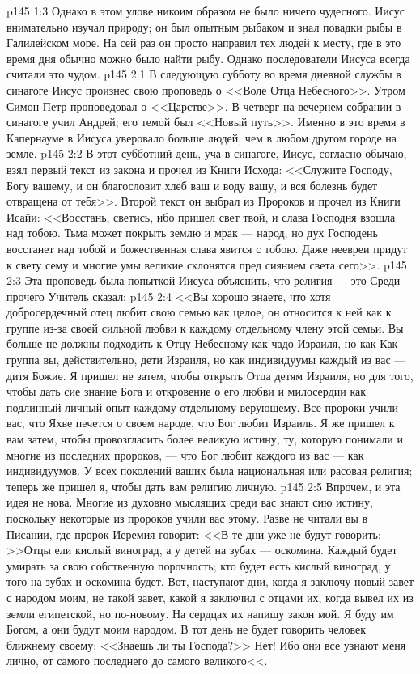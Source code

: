 \vs p145 1:3 Однако в этом улове никоим образом не было ничего чудесного. Иисус внимательно изучал природу; он был опытным рыбаком и знал повадки рыбы в Галилейском море. На сей раз он просто направил тех людей к месту, где в это время дня обычно можно было найти рыбу. Однако последователи Иисуса всегда считали это чудом.
\vs p145 2:1 В следующую субботу во время дневной службы в синагоге Иисус произнес свою проповедь о <<Воле Отца Небесного>>. Утром Симон Петр проповедовал о <<Царстве>>. В четверг на вечернем собрании в синагоге учил Андрей; его темой был <<Новый путь>>. Именно в это время в Капернауме в Иисуса уверовало больше людей, чем в любом другом городе на земле.
\vs p145 2:2 В этот субботний день, уча в синагоге, Иисус, согласно обычаю, взял первый текст из закона и прочел из Книги Исхода: <<Служите Господу, Богу вашему, и он благословит хлеб ваш и воду вашу, и вся болезнь будет отвращена от тебя>>. Второй текст он выбрал из Пророков и прочел из Книги Исайи: <<Восстань, светись, ибо пришел свет твой, и слава Господня взошла над тобою. Тьма может покрыть землю и мрак --- народ, но дух Господень восстанет над тобой и божественная слава явится с тобою. Даже неевреи придут к свету сему и многие умы великие склонятся пред сиянием света сего>>.
\vs p145 2:3 Эта проповедь была попыткой Иисуса объяснить, что религия --- это  Среди прочего Учитель сказал:
\vs p145 2:4 <<Вы хорошо знаете, что хотя добросердечный отец любит свою семью как целое, он относится к ней как к группе из\hyp{}за своей сильной любви к каждому отдельному члену этой семьи. Вы больше не должны подходить к Отцу Небесному как чадо Израиля, но как  Как группа вы, действительно, дети Израиля, но как индивидуумы каждый из вас --- дитя Божие. Я пришел не затем, чтобы открыть Отца детям Израиля, но для того, чтобы дать сие знание Бога и откровение о его любви и милосердии как подлинный личный опыт каждому отдельному верующему. Все пророки учили вас, что Яхве печется о своем народе, что Бог любит Израиль. Я же пришел к вам затем, чтобы провозгласить более великую истину, ту, которую понимали и многие из последних пророков, --- что Бог любит  каждого из вас --- как индивидуумов. У всех поколений ваших была национальная или расовая религия; теперь же пришел я, чтобы дать вам религию личную.
\vs p145 2:5 Впрочем, и эта идея не нова. Многие из духовно мыслящих среди вас знают сию истину, поскольку некоторые из пророков учили вас этому. Разве не читали вы в Писании, где пророк Иеремия говорит: <<В те дни уже не будут говорить: >>Отцы ели кислый виноград, а у детей на зубах --- оскомина. Каждый будет умирать за свою собственную порочность; кто будет есть кислый виноград, у того на зубах и оскомина будет. Вот, наступают дни, когда я заключу новый завет с народом моим, не такой завет, какой я заключил с отцами их, когда вывел их из земли египетской, но по\hyp{}новому. На сердцах их напишу закон мой. Я буду им Богом, а они будут моим народом. В тот день не будет говорить человек ближнему своему: <<Знаешь ли ты Господа?>> Нет! Ибо они все узнают меня лично, от самого последнего до самого великого<<.
